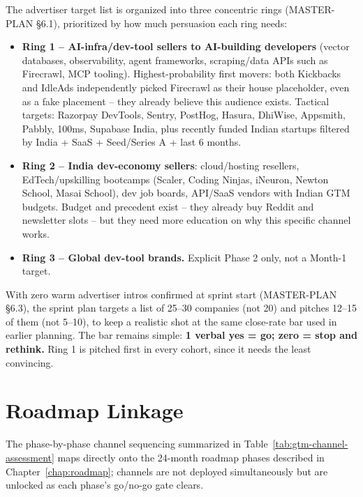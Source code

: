 The advertiser target list is organized into three concentric rings (MASTER-PLAN \S6.1), prioritized by how much persuasion each ring needs:

\begin{itemize}
  \item \textbf{Ring 1 -- AI-infra/dev-tool sellers to AI-building developers} (vector databases, observability, agent frameworks, scraping/data APIs such as Firecrawl, MCP tooling). Highest-probability first movers: both Kickbacks and IdleAds independently picked Firecrawl as their house placeholder, even as a fake placement -- they already believe this audience exists. Tactical targets: Razorpay DevTools, Sentry, PostHog, Hasura, DhiWise, Appsmith, Pabbly, 100ms, Supabase India, plus recently funded Indian startups filtered by India + SaaS + Seed/Series A + last 6 months.
  \item \textbf{Ring 2 -- India dev-economy sellers}: cloud/hosting resellers, EdTech/upskilling bootcamps (Scaler, Coding Ninjas, iNeuron, Newton School, Masai School), dev job boards, API/SaaS vendors with Indian GTM budgets. Budget and precedent exist -- they already buy Reddit and newsletter slots -- but they need more education on why this specific channel works.
  \item \textbf{Ring 3 -- Global dev-tool brands.} Explicit Phase 2 only, not a Month-1 target.
\end{itemize}

With zero warm advertiser intros confirmed at sprint start (MASTER-PLAN \S6.3), the sprint plan targets a list of 25--30 companies (not 20) and pitches 12--15 of them (not 5--10), to keep a realistic shot at the same close-rate bar used in earlier planning. The bar remains simple: \textbf{1 verbal yes = go; zero = stop and rethink.} Ring 1 is pitched first in every cohort, since it needs the least convincing.

\section{Roadmap Linkage}

The phase-by-phase channel sequencing summarized in Table~\ref{tab:gtm-channel-assessment} maps directly onto the 24-month roadmap phases described in Chapter~\ref{chap:roadmap}; channels are not deployed simultaneously but are unlocked as each phase's go/no-go gate clears.

